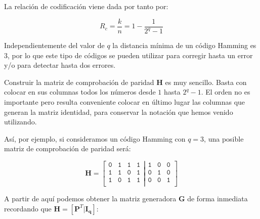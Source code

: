 \documentclass[es,apuntes]{uah}
\begin{document}
 
La relación de codificación viene dada por tanto por:

\begin{displaymath}
	R_c = \frac{k}{n} = 1 - \frac{1}{2^q -1}
\end{displaymath}

Independientemente del valor de $q$ la distancia mínima de un código Hamming es $3$, por lo que este tipo de códigos se pueden utilizar para corregir hasta un error y/o para detectar hasta dos errores. 

Construir la matriz de comprobación de paridad $\mathbf{H}$ es muy sencillo. Basta con colocar en sus columnas todos los números desde $1$ hasta $2^q-1$. El orden no es importante pero resulta conveniente colocar en último lugar las columnas que generan la matriz identidad, para conservar la notación que hemos venido utilizando. 

Así, por ejemplo, si consideramos un código Hamming con $q=3$, una posible matriz de comprobación de paridad será:

\begin{displaymath}
	\mathbf{H} = \left [ \begin{array}{cccc}
	\mathtt{0} & \mathtt{1} & \mathtt{1} & \mathtt{1}\\
	\mathtt{1} & \mathtt{1} & \mathtt{0} & \mathtt{1}\\
	\mathtt{1} & \mathtt{0} & \mathtt{1} & \mathtt{1}\\ 	
 \end{array}
 \left |
  \begin{array}{ccc}
	\mathtt{1} & \mathtt{0} & \mathtt{0} \\
	\mathtt{0} & \mathtt{1} & \mathtt{0} \\
	\mathtt{0} & \mathtt{0} & \mathtt{1} \\
 \end{array}
 \right.
	\right ]
\end{displaymath}


A partir de aquí podemos obtener la matriz generadora $\mathbf{G}$ de forma inmediata recordando que $\mathbf{H} = [\mathbf{P}^T | \mathbf{I_q}]$:
\end{document}
